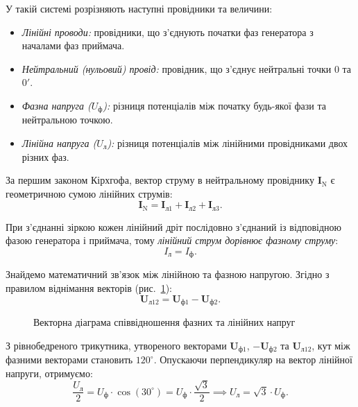 У такій системі розрізняють наступні провідники та величини:
\begin{itemize}
    \item \emph{Лінійні проводи:} провідники, що з'єднують початки фаз генератора з началами фаз приймача.
    \item \emph{Нейтральний (нульовий) провід:} провідник, що з'єднує нейтральні точки $0$ та $0'$.
    \item \emph{Фазна напруга ($U_\text{ф}$):} різниця потенціалів між початку будь-якої фази та нейтральною точкою.
    \item \emph{Лінійна напруга ($U_\text{л}$):} різниця потенціалів між лінійними провідниками двох різних фаз.
\end{itemize}

За першим законом Кірхгофа, вектор струму в нейтральному провіднику $\mathbf{I}_\text{N}$ є геометричною сумою лінійних струмів:
\begin{equation}
	\mathbf{I}_\text{N} = \mathbf{I}_{\text{л}1} + \mathbf{I}_{\text{л}2} + \mathbf{I}_{\text{л}3}.
\end{equation}

При з'єднанні зіркою кожен лінійний дріт послідовно з'єднаний із відповідною фазою генератора і приймача, тому \emph{лінійний струм дорівнює фазному струму}:
\begin{equation}
	I_\text{л} = I_\text{ф}.
\end{equation}

Знайдемо математичний зв'язок між лінійною та фазною напругою. Згідно з правилом віднімання векторів (рис.~\ref{pic:ThreePhaseVectorDiagram}):
\begin{equation}
	\mathbf{U}_{\text{л}12} = \mathbf{U}_{\text{ф}1} - \mathbf{U}_{\text{ф}2}.
\end{equation}

\begin{figure}[h!]
	\centering
	\caption{Векторна діаграма співвідношення фазних та лінійних напруг}
	\label{pic:ThreePhaseVectorDiagram}
\end{figure}

З рівнобедреного трикутника, утвореного векторами $\mathbf{U}_{\text{ф}1}$, $-\mathbf{U}_{\text{ф}2}$ та $\mathbf{U}_{\text{л}12}$, кут між фазними векторами становить $120^\circ$. Опускаючи перпендикуляр на вектор лінійної напруги, отримуємо:
\begin{equation}
	\frac{U_\text{л}}{2} = U_\text{ф} \cdot \cos(30^\circ) = U_\text{ф} \cdot \frac{\sqrt{3}}{2} \implies U_\text{л} = \sqrt{3} \cdot U_\text{ф}.
\end{equation}

